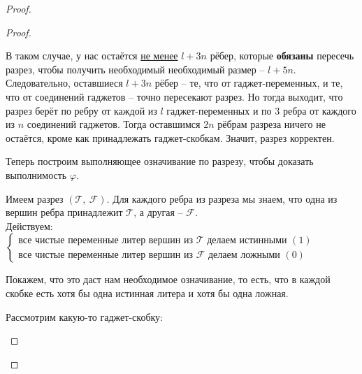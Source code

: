 \documentclass[a4paper,12pt]{article}
\begin{document}
\begin{proof}
\begin{proof}
\begin{itemize}
            В таком случае, у нас остаётся \underline{не менее} $l + 3n$ рёбер, которые \textbf{обязаны} пересечь разрез, чтобы получить необходимый необходимый размер -- $l + 5n$. Следовательно, оставшиеся $l + 3n$ рёбер -- те, что от гаджет-переменных, и те, что от соединений гаджетов -- точно пересекают разрез. Но тогда выходит, что разрез берёт по ребру от каждой из $l$ гаджет-переменных и по 3 ребра от каждого из $n$ соединений гаджетов. Тогда оставшимся $2n$ рёбрам разреза ничего не остаётся, кроме как принадлежать гаджет-скобкам. Значит, разрез корректен.
            
            Теперь построим выполняющее означивание по разрезу, чтобы доказать выполнимость $\varphi$.
            
            Имеем разрез $(\mathcal{T},\ \mathcal{F})$. Для каждого ребра из разреза мы знаем, что одна из вершин ребра принадлежит $\mathcal{T}$, а другая -- $\mathcal{F}$.\\ Действуем:$\begin{cases}\text{все чистые переменные литер вершин из }\mathcal{T}\text{ делаем истинными }(1)\\\text{все чистые переменные литер вершин из }\mathcal{F}\text{ делаем ложными }(0)\end{cases}$
            
            Покажем, что это даст нам необходимое означивание, то есть, что в каждой скобке есть хотя бы одна истинная литера и хотя бы одна ложная. 
            
            Рассмотрим какую-то гаджет-скобку:
            \begin{center}
\end{center}
\end{itemize}
\end{proof}
\end{proof}
\end{document}
